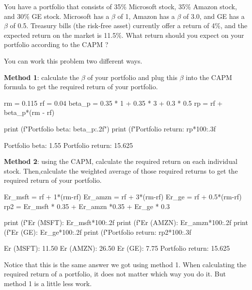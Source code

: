 \begin{question}
You have a portfolio that consists of 35\% Microsoft stock, 35\% Amazon stock, and 30\% GE stock. Microsoft has a $\beta$ of 1, Amazon has a $\beta$ of 3.0, and GE has a $\beta$ of 0.5. Treasury bills (the risk-free asset) currently offer a return of 4\%, and the expected return on the market is 11.5\%. What return should you expect on your portfolio according to the CAPM ? 
\end{question}

\cprotEnv \begin{solution}
You can work this problem two different ways.

\textbf{Method 1}: calculate the $\beta$ of your portfolio and plug this $\beta$ into the CAPM formula to get the required return of your portfolio.

\begin{ipython}
rm = 0.115
rf = 0.04
beta_p = 0.35 * 1 + 0.35 * 3 + 0.3 * 0.5
rp = rf + beta_p*(rm - rf)

print (f"Portfolio beta: {beta_p:.2f}")
print (f"Portfolio return: {rp*100:.3f}%
\end{ipython}
\begin{ioutput}
Portfolio beta: 1.55
Portfolio return: 15.625%
\end{ioutput}

\textbf{Method 2}: using the CAPM, calculate the required return on each individual stock. Then,calculate the weighted average of those required returns to get the required return of your portfolio.

\begin{ipython}
Er_msft = rf + 1*(rm-rf)
Er_amzn = rf + 3*(rm-rf)
Er_ge = rf + 0.5*(rm-rf)
rp2 = Er_msft * 0.35 + Er_amzn *0.35 + Er_ge * 0.3

print (f"Er (MSFT): {Er_msft*100:.2f}%
print (f"Er (AMZN): {Er_amzn*100:.2f}%
print (f"Er (GE): {Er_ge*100:.2f}%
print (f"Portfolio return: {rp2*100:.3f}%
\end{ipython}
\begin{ioutput}
Er (MSFT): 11.50%
Er (AMZN): 26.50%
Er (GE): 7.75%
Portfolio return: 15.625%
\end{ioutput}
Notice that this is the same answer we got using method 1. When calculating the required return of a portfolio, it does not matter which way you do it. But method 1 is a little less work.
\end{solution}
